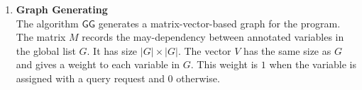 \begin{enumerate}
\begin{figure}
{
}
 \caption{The key rule of the variable estimation algorithm. }
 \label{fig:prework-static_alg1}
\end{figure}
%
\item \textbf{Graph Generating}
\\
The algorithm $\mathsf{GG}$ generates a matrix-vector-based graph for the program. 
The matrix $M$ records the may-dependency between annotated variables in the global list $G$. It has size $|G| \times |G|$. The vector $V$ has the same size as $G$ and gives a weight to each variable in $G$.
This weight is $1$ when the variable is assigned with a query request and $0$ otherwise. 


\end{enumerate}
